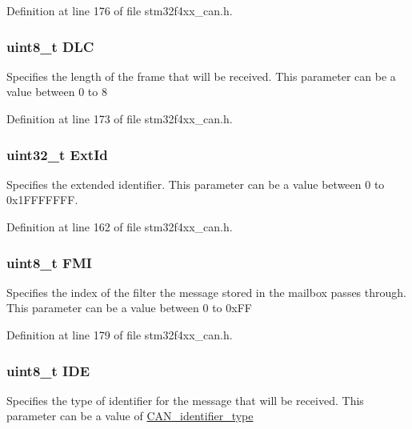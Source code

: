 Definition at line 176 of file stm32f4xx\-\_\-can.\-h.

\hypertarget{struct_can_rx_msg_a5f86974a53a85fb5706e08f8106296b9}{
\subsubsection[{D\-L\-C}]{\setlength{\rightskip}{0pt plus 5cm}uint8\-\_\-t D\-L\-C}}\label{struct_can_rx_msg_a5f86974a53a85fb5706e08f8106296b9}
Specifies the length of the frame that will be received. This parameter can be a value between 0 to 8 

Definition at line 173 of file stm32f4xx\-\_\-can.\-h.

\hypertarget{struct_can_rx_msg_a8625d2aaf6b0b99f0faf0b8cd07debd4}{
\subsubsection[{Ext\-Id}]{\setlength{\rightskip}{0pt plus 5cm}uint32\-\_\-t Ext\-Id}}\label{struct_can_rx_msg_a8625d2aaf6b0b99f0faf0b8cd07debd4}
Specifies the extended identifier. This parameter can be a value between 0 to 0x1\-F\-F\-F\-F\-F\-F\-F. 

Definition at line 162 of file stm32f4xx\-\_\-can.\-h.

\hypertarget{struct_can_rx_msg_af219946419093720aad14ef427f3cde4}{
\subsubsection[{F\-M\-I}]{\setlength{\rightskip}{0pt plus 5cm}uint8\-\_\-t F\-M\-I}}\label{struct_can_rx_msg_af219946419093720aad14ef427f3cde4}
Specifies the index of the filter the message stored in the mailbox passes through. This parameter can be a value between 0 to 0x\-F\-F 

Definition at line 179 of file stm32f4xx\-\_\-can.\-h.

\hypertarget{struct_can_rx_msg_accecf260a60cf687f0f9898421aeea86}{
\subsubsection[{I\-D\-E}]{\setlength{\rightskip}{0pt plus 5cm}uint8\-\_\-t I\-D\-E}}\label{struct_can_rx_msg_accecf260a60cf687f0f9898421aeea86}
Specifies the type of identifier for the message that will be received. This parameter can be a value of \hyperlink{group___c_a_n__identifier__type}{C\-A\-N\-\_\-identifier\-\_\-type} 

